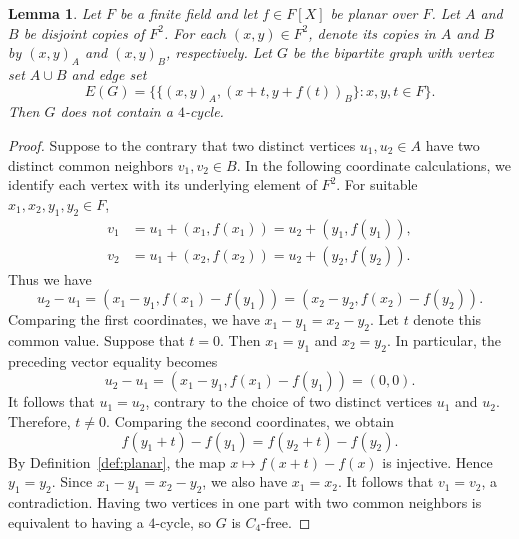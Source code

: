 \documentclass[10pt,a4paper]{amsart}
\newtheorem{lemma}{Lemma}
\begin{document}
\begin{lemma}\label{lem:planar-graph}
Let $F$ be a finite field and let $f\in F[X]$ be planar over $F$. Let $A$ and $B$ be disjoint copies of $F^2$. For each $(x,y)\in F^2$, denote its copies in $A$ and $B$ by $(x,y)_A$ and $(x,y)_B$, respectively. Let $G$ be the bipartite graph with vertex set $A\cup B$ and edge set
\[
        E(G)=\bigl\{\{(x,y)_A,(x+t,y+f(t))_B\}:x,y,t\in F\bigr\}.
\]
Then $G$ does not contain a $4$-cycle.
\end{lemma}

\begin{proof}
Suppose to the contrary that two distinct vertices $u_1,u_2\in A$ have two distinct common neighbors $v_1,v_2\in B$. In the following coordinate calculations, we identify each vertex with its underlying element of $F^2$. For suitable $x_1,x_2,y_1,y_2\in F$,
\begin{align*}
v_1&=u_1+(x_1,f(x_1))=u_2+(y_1,f(y_1)),\\
v_2&=u_1+(x_2,f(x_2))=u_2+(y_2,f(y_2)).
\end{align*}
Thus we have
\[
 u_2-u_1
 =(x_1-y_1,f(x_1)-f(y_1))
 =(x_2-y_2,f(x_2)-f(y_2)).
\]
Comparing the first coordinates, we have
$x_1-y_1=x_2-y_2$. Let $t$ denote this common value.
Suppose that $t=0$. Then $x_1=y_1$ and $x_2=y_2$. In particular, the preceding vector equality becomes
\[
 u_2-u_1=(x_1-y_1,f(x_1)-f(y_1))=(0,0).
\]
It follows that $u_1=u_2$, contrary to the choice of two distinct vertices $u_1$ and $u_2$. Therefore, $t\ne0$.
Comparing the second coordinates, we obtain
\[
f(y_1+t)-f(y_1)=f(y_2+t)-f(y_2).
\]
By Definition~\ref{def:planar}, the map
$x\mapsto f(x+t)-f(x)$ is injective. Hence $y_1=y_2$. Since $x_1-y_1=x_2-y_2$, we also have $x_1=x_2$. It follows that $v_1=v_2$, a contradiction. Having two vertices in one part with two common neighbors is equivalent to having a $4$-cycle, so $G$ is $C_4$-free.
\end{proof}
\end{document}
